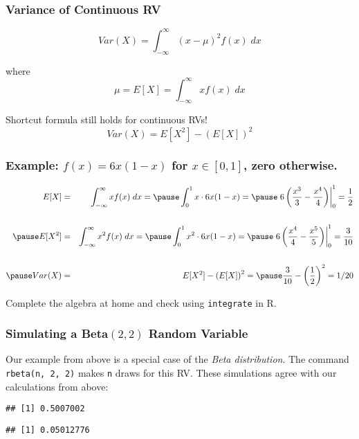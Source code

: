 \begin{frame}
\frametitle{Variance of Continuous RV}

$$\boxed{Var(X) = \int_{-\infty}^{\infty} (x - \mu)^2 f(x) \; dx}$$

\vspace{2em}
where
$$\mu = E[X]=\int_{-\infty}^\infty x f(x) \; dx $$

\vspace{2em}
\alert{Shortcut formula still holds for continuous RVs!}
	$$Var(X) = E[X^2] - \left(E[X]\right)^2$$
\end{frame}
\begin{frame}
  \frametitle{Example: $f(x) = 6x(1-x)$ for $x \in [0,1]$, zero otherwise.}

  \small
    \begin{eqnarray*}
      E[X] &=& \int_{-\infty}^{\infty} x f(x)\; dx =\pause \int_0^1 x \cdot 6x(1-x) =\pause \left. 6\left( \frac{x^3}{3} - \frac{x^4}{4} \right)\right|_{0}^1 = \frac{1}{2}\\ \\ 
      \pause
      E[X^2] &=& \int_{-\infty}^{\infty} x^2 f(x)\; dx =\pause \int_0^1 x^2 \cdot 6x(1-x) = \pause \left. 6\left( \frac{x^4}{4} - \frac{x^5}{5} \right) \right|_0^1 = \frac{3}{10} \\ \\ 
      \pause
      Var(X) &=& E[X^2] - \left(E[X]\right)^2 = \pause \frac{3}{10} - \left( \frac{1}{2} \right)^2 = 1/20 
    \end{eqnarray*}

    \alert{Complete the algebra at home and check using \texttt{integrate} in R.}
\end{frame}
\begin{frame}[fragile]
  \frametitle{Simulating a Beta$(2, 2)$ Random Variable}
  Our example from above is a special case of the \emph{\alert{Beta distribution}}.
  The command \texttt{rbeta(n, 2, 2)} makes \texttt{n} draws for this RV.
  These simulations agree with our calculations from above:

\begin{knitrout}
\color{fgcolor}\begin{kframe}
\begin{alltt}
\hlstd{(}\hlstd{)}
 \hlkwb{<-} \hlstd{(}\hlstd{,} \hlstd{,} \hlstd{)}
\end{alltt}
\begin{verbatim}
## [1] 0.5007002
\end{verbatim}
\begin{alltt}
\end{alltt}
\begin{verbatim}
## [1] 0.05012776
\end{verbatim}
\end{kframe}
\end{knitrout}


\end{frame}
